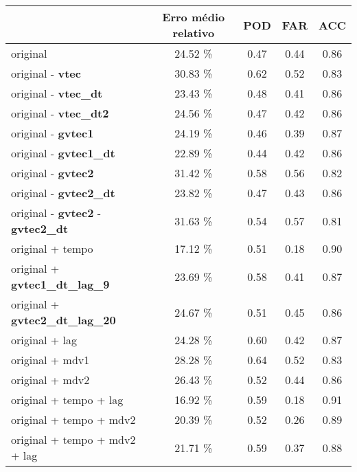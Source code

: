 \begin{table}
\begin{center}
\begin{tabular}{|l|c|c|c|c|}
\hline

	                          & Erro médio relativo	& POD	& FAR	& ACC  \\ \hline
original	                                     & 24.52 \%	&0.47 & 	0.44 &  0.86 \\ \hline
original - {\bf vtec}	                         & 30.83 \%	&0.62 & 	0.52 &  0.83 \\ \hline
original - {\bf vtec\_dt}	                     & 23.43 \%	&0.48 & 	0.41 &  0.86 \\ \hline
original - {\bf vtec\_dt2}	                     & 24.56 \%	&0.47 & 	0.42 &  0.86 \\ \hline
original - {\bf gvtec1}	                         & 24.19 \%	&0.46 & 	0.39 &  0.87 \\ \hline
original - {\bf gvtec1\_dt}	                     & 22.89 \%	&0.44 &  	0.42 &  0.86 \\ \hline
original - {\bf gvtec2}	                         & 31.42 \%	&0.58 & 	0.56 &  0.82 \\ \hline
original - {\bf gvtec2\_dt}	                     & 23.82 \%	&0.47 & 	0.43 &  0.86 \\ \hline
original - {\bf gvtec2} - {\bf gvtec2\_dt}       & 31.63 \% &0.54 &     0.57 &  0.81 \\ \hline
original + tempo	                             & 17.12 \%	&0.51 & 	0.18 &  0.90 \\ \hline
original + {\bf gvtec1\_dt\_lag\_9}              & 23.69 \%	&0.58 & 	0.41 &  0.87 \\ \hline
original + {\bf gvtec2\_dt\_lag\_20}             & 24.67 \%	&0.51 & 	0.45 &  0.86 \\ \hline
original + lag	                                 & 24.28 \%	&0.60 & 	0.42 &  0.87 \\ \hline
original + mdv1	                                 & 28.28 \%	&0.64 & 	0.52 &  0.83 \\ \hline
original + mdv2	                                 & 26.43 \%	&0.52 & 	0.44 &  0.86 \\ \hline
original + tempo + lag	                         & 16.92 \%	&0.59 & 	0.18 &  0.91 \\ \hline
original + tempo + mdv2	                         & 20.39 \%	&0.52 & 	0.26 &  0.89 \\ \hline
original + tempo + mdv2 + lag 	                 & 21.71 \%	&0.59 & 	0.37 &  0.88 \\ \hline

\end{tabular}
\end{center}
\end{table}

